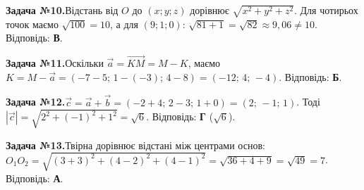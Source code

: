 \documentclass[12pt]{article}
\begin{document}
\par\vspace{0.3cm}\noindent\hypertarget{sol:10}{}
\begin{tcolorbox}[colback=titleBg!40, colframe=mainGreen!55, boxrule=0.4pt, arc=2pt, left=6pt, right=6pt, top=4pt, bottom=4pt, breakable]
\noindent\small\textbf{Задача №10.}\quad Відстань від $O$ до $(x;y;z)$ дорівнює $\sqrt{x^2+y^2+z^2}$. Для чотирьох точок маємо $\sqrt{100}=10$, а для $(9;1;0)$: $\sqrt{81+1}=\sqrt{82}\approx 9{,}06\neq 10$. Відповідь: \textbf{В}.
\par\vspace{0.1cm}\hfill\hyperlink{task:10}{}
\end{tcolorbox}
\par\vspace{0.3cm}\noindent\hypertarget{sol:11}{}
\begin{tcolorbox}[colback=titleBg!40, colframe=mainGreen!55, boxrule=0.4pt, arc=2pt, left=6pt, right=6pt, top=4pt, bottom=4pt, breakable]
\noindent\small\textbf{Задача №11.}\quad Оскільки $\vec{a}=\overrightarrow{KM}=M-K$, маємо $K=M-\vec{a}=(-7-5;\,1-(-3);\,4-8)=(-12;\,4;\,-4)$. Відповідь: \textbf{Б}.
\par\vspace{0.1cm}\hfill\hyperlink{task:11}{}
\end{tcolorbox}
\par\vspace{0.3cm}\noindent\hypertarget{sol:12}{}
\begin{tcolorbox}[colback=titleBg!40, colframe=mainGreen!55, boxrule=0.4pt, arc=2pt, left=6pt, right=6pt, top=4pt, bottom=4pt, breakable]
\noindent\small\textbf{Задача №12.}\quad $\vec{c} = \vec{a} + \vec{b} = (-2+4;\, 2-3;\, 1+0) = (2;\, -1;\, 1)$. Тоді $|\vec{c}| = \sqrt{2^2 + (-1)^2 + 1^2} = \sqrt{6}$. Відповідь: \textbf{Г} ($\sqrt6$).
\par\vspace{0.1cm}\hfill\hyperlink{task:12}{}
\end{tcolorbox}
\par\vspace{0.3cm}\noindent\hypertarget{sol:13}{}
\begin{tcolorbox}[colback=titleBg!40, colframe=mainGreen!55, boxrule=0.4pt, arc=2pt, left=6pt, right=6pt, top=4pt, bottom=4pt, breakable]
\noindent\small\textbf{Задача №13.}\quad Твірна дорівнює відстані між центрами основ: $O_1O_2=\sqrt{(3+3)^2+(4-2)^2+(4-1)^2}=\sqrt{36+4+9}=\sqrt{49}=7$. Відповідь: \textbf{А}.
\par\vspace{0.1cm}\hfill\hyperlink{task:13}{}
\end{tcolorbox}
\end{document}
